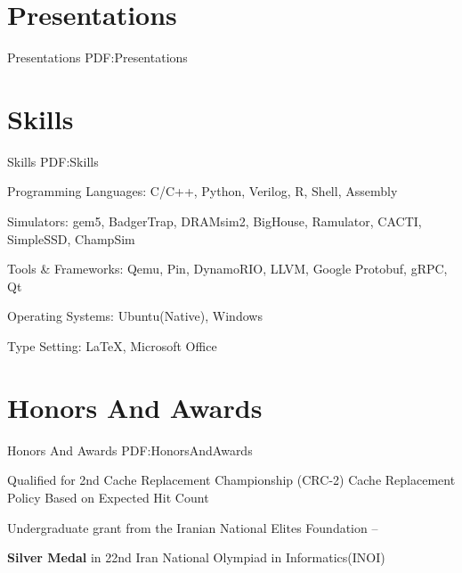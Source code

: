 \documentclass[a4paper,9pt,oneside]{article}
\begin{document}
\begin{body}

\section
{Presentations}
{Presentations}
{PDF:Presentations}


\section
{Skills}
{Skills}
{PDF:Skills}

\BulletItem
Programming Languages:
C/C++,
Python,
Verilog,
R,
Shell,
Assembly

\BulletItem
Simulators:
gem5,
BadgerTrap,
DRAMsim2,
BigHouse,
Ramulator,
CACTI,
SimpleSSD,
ChampSim

\BulletItem
Tools \& Frameworks:
Qemu,
Pin,
DynamoRIO,
LLVM,
Google Protobuf,
gRPC,
Qt

\BulletItem
Operating Systems:
Ubuntu(Native),
Windows

\BulletItem
Type Setting:
{\LaTeX},
Microsoft Office



\section
{Honors\newline
And\newline
Awards}
{Honors\newline
And\newline
Awards}
{PDF:HonorsAndAwards}

\BulletItem
Qualified for 2nd Cache Replacement Championship (CRC-2)
\SubBulletItem
Cache Replacement Policy Based on Expected Hit Count
\hfill
{}

\BulletItem
Undergraduate grant from the Iranian National Elites Foundation
\hfill
{} -- 

\BulletItem
\textbf{Silver Medal} in 22nd Iran National Olympiad in Informatics(INOI)
\hfill
{}






\end{body}
\end{document}
